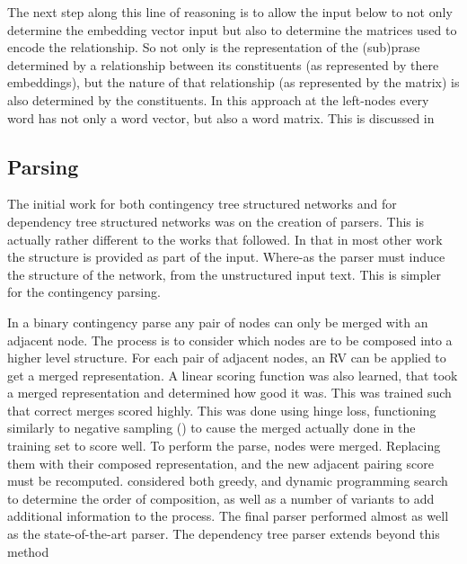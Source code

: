 \documentclass[12pt,parskip]{komatufte}
\begin{document}
The next step along this line of reasoning is to allow the input below to not only determine the embedding vector input but also to determine the matrices used to encode the relationship.
So not only is the representation of the (sub)prase determined by a relationship between  its constituents (as represented by there embeddings),
but the nature of that relationship (as represented by the matrix) is also determined by the constituents.
In this approach at the left-nodes every word has not only a word vector, but also a word matrix.
This is discussed in 


\subsection{Parsing}
The initial work for both contingency tree structured networks  \parencite{socher2010PhraseEmbedding} and for dependency tree structured networks  was on the creation of parsers.
This is actually rather different to the works that followed.
In that in most other work the structure is provided as part of the input.
Where-as the parser must induce the structure of the network,
from the unstructured input text.
This is simpler for the contingency parsing.

In a binary contingency parse any pair of nodes can only be merged with an adjacent node.
The process is to consider which nodes are to be composed into a higher level structure.
For each pair of adjacent nodes, an RV can be applied to get a merged representation.
A linear scoring function was also learned, that took a merged representation and determined how good it was.
This was trained such that correct merges scored highly.
This was done using hinge loss, functioning similarly to negative sampling () to cause the merged actually done in the training set to score well.
To perform the parse, nodes were merged.
Replacing them with their composed representation, and the new adjacent pairing score must be recomputed.
\textcite{socher2010PhraseEmbedding} considered both greedy, and dynamic programming search to determine the order of composition, as well as a number of variants to add additional information to the process.
The final parser performed almost as well as the state-of-the-art parser.
The dependency tree parser extends beyond this method
\end{document}

